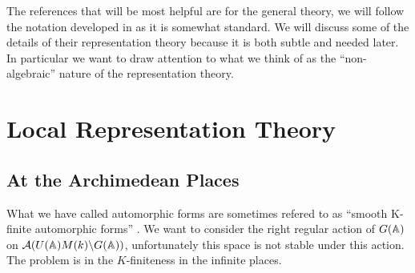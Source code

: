 The references that will be most helpful are \cite[I.II]{borelAutomorphicFormsRepresentations1979}\cite{getzIntroductionAutomorphicRepresentations2024} for the general theory, we will follow the notation developed in \cite{moeglinSpectralDecompositionEisenstein1995} as it is somewhat standard. We will discuss some of the details of their representation theory because it is both subtle and needed later. In particular we want to draw attention to what we think of as the ``non-algebraic'' nature of the representation theory.
\section{Local Representation Theory}
\subsection{At the Archimedean Places}
What we have called automorphic forms are sometimes refered to as ``smooth K-finite automorphic forms'' \cite[2.2]{cogdellLecturesLfunctionsConverse}.
We want to consider the right regular action of \(G(\A)\) on \(\mathcal{A}(U(\A)M(k)\backslash G(\A))\), unfortunately this space is not stable under this action. The problem is in the \(K\)-finiteness in the infinite places. 

